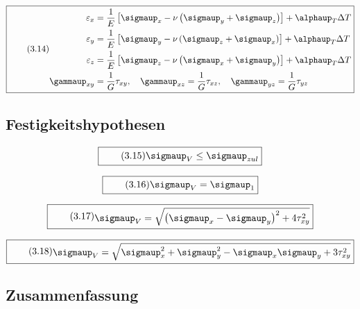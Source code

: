 \documentclass[11pt]{article}
\newcommand{\1}{ {\mathds{1}} }
\renewcommand{\alpha  }{\mathit{\alphaup}   }
\renewcommand{\gamma  }{\gammaup   }
\renewcommand{\sigma  }{\sigmaup   }
\begin{document}
		\begin{equation}
			\boxed{
				\tag{3.14}
				\begin{split}
					\varepsilon_x &= \frac{1}{E}\left[\sigma_x -\nu   \left(\sigma_y + \sigma_z\right)\right] + \alpha_T\Delta T
					\\
					\varepsilon_y &= \frac{1}{E}\left[\sigma_y -\nu   \left(\sigma_z + \sigma_x\right)\right] + \alpha_T\Delta T\\
					\varepsilon_z &= \frac{1}{E}\left[\sigma_z -\nu   \left(\sigma_x + \sigma_y\right)\right] + \alpha_T\Delta T\\
					\gamma_{xy} &= \frac{1}{G}\tau_{xy}, \quad \gamma_{xz} = \frac{1}{G}\tau_{xz}, \quad \gamma_{yz} = \frac{1}{G}\tau_{yz}
				\end{split}
			}
		\end{equation}

		\subsection{Festigkeitshypothesen}

		\begin{equation}
			\boxed{
				\tag{3.15}
				\begin{split}
					\sigma_V \leq \sigma_{zul}
				\end{split}
			}
		\end{equation}

		\begin{equation}
			\boxed{
				\tag{3.16}
				\begin{split}
					\sigma_V= \sigma_1
				\end{split}
			}
		\end{equation}

		\begin{equation}
			\boxed{
				\tag{3.17}
				\begin{split}
					\sigma_V= \sqrt{ \left( \sigma_x - \sigma_y \right)^2 + 4\tau^2_{xy} }
				\end{split}
			}
		\end{equation}

		\begin{equation}
			\boxed{
				\tag{3.18}
				\begin{split}
					\sigma_V= \sqrt{\sigma_x^2 + \sigma_y^2 -\sigma_x\sigma_y + 3\tau^2_{xy} }
				\end{split}
			}
		\end{equation}

		\subsection{Zusammenfassung}
\end{document}
